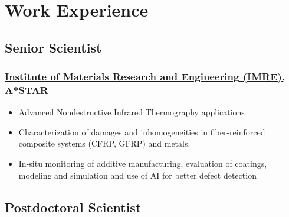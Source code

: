 \documentclass{my_cv}%
\begin{document}
\section{Work Experience}
\vspace{1.0em}
\subsection{Senior Scientist}
\subsubsection{\href{https://www.a-star.edu.sg/imre}{Institute of Materials Research and Engineering (IMRE), A*STAR}}
\begin{itemize}[leftmargin=0.15in]
\setlength\itemsep{-0.1em}
\color{mygray}
\item Advanced Nondestructive Infrared Thermography applications
\item Characterization of damages and inhomogeneities in fiber-reinforced composite systems (CFRP, GFRP) and metals.
\item In-situ monitoring of additive manufacturing, evaluation of coatings, modeling and simulation and use of AI for better defect detection 
\end{itemize}%
{\color{mygray1} \hdashrule[0.1ex]{18.8cm}{0.2mm}{1mm}}
\subsection{Postdoctoral Scientist}
\end{document}
